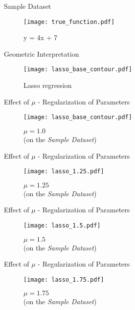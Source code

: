 \documentclass{beamer}
\begin{document}
\begin{frame}{Sample Dataset}

\begin{figure}
    \centering
    \texttt{[image: true\_function.pdf]}
    \caption{y = 4x + 7}
    \label{fig:my_label}
\end{figure}{}

\end{frame}

\begin{frame}{Geometric Interpretation}
\begin{figure}
    \centering
    \texttt{[image: lasso\_base\_contour.pdf]}
    \caption{Lasso regression}
    \label{fig:my_label}
\end{figure}

\end{frame}

\begin{frame}{Effect of $\mu$ - Regularization of Parameters}
\vspace{0.4cm}
\begin{figure}

\texttt{[image: lasso\_base\_contour.pdf]}
\caption{$\mu = 1.0$\\(on the \emph{Sample Dataset})}
\end{figure}
\end{frame}

\begin{frame}{Effect of $\mu$ - Regularization of Parameters}
\vspace{0.4cm}
\begin{figure}\texttt{[image: lasso\_1.25.pdf]}\caption{$\mu = 1.25$\\(on the \emph{Sample Dataset})}
\end{figure}
\end{frame}

\begin{frame}{Effect of $\mu$ - Regularization of Parameters}
\vspace{0.4cm}
\begin{figure}\texttt{[image: lasso\_1.5.pdf]}\caption{$\mu = 1.5$\\(on the \emph{Sample Dataset})}
\end{figure}
\end{frame}

\begin{frame}{Effect of $\mu$ - Regularization of Parameters}
\vspace{0.4cm}
\begin{figure}\texttt{[image: lasso\_1.75.pdf]}\caption{$\mu = 1.75$\\(on the \emph{Sample Dataset})}
\end{figure}
\end{frame}
\end{document}
